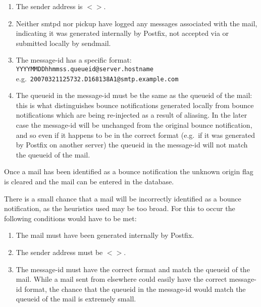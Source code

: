 \documentclass[a4paper,12pt,draft]{article}
\begin{document}
\begin{enumerate}

    \item The sender address is $<>$.

    \item Neither smtpd nor pickup have logged any messages associated with
        the mail, indicating it was generated internally by Postfix, not
        accepted via \SMTP{} or submitted locally by sendmail.

    \item The message-id has a specific format: \newline
        \texttt{YYYYMMDDhhmmss.queueid@server.hostname} \newline
        e.g.\ \texttt{20070321125732.D168138A1@smtp.example.com}

    \item The queueid in the message-id must be the same as the queueid of
        the mail: this is what distinguishes bounce notifications generated
        locally from bounce notifications which are being re-injected as a
        result of aliasing.  In the later case the message-id will be
        unchanged from the original bounce notification, and so even if it
        happens to be in the correct format (e.g.\ if it was generated by
        Postfix on another server) the queueid in the message-id will not
        match the queueid of the mail.

\end{enumerate}

Once a mail has been identified as a bounce notification the unknown origin
flag is cleared and the mail can be entered in the database.

There is a small chance that a mail will be incorrectly identified as a
bounce notification, as the heuristics used may be too broad.  For this to
occur the following conditions would have to be met:

\begin{enumerate}

    \item The mail must have been generated internally by Postfix.

    \item The sender address must be $<>$.

    \item The message-id must have the correct format and match the queueid
        of the mail.  While a mail sent from elsewhere could easily have
        the correct message-id format, the chance that the queueid in the
        message-id would match the queueid of the mail is extremely small.

\end{enumerate}
\end{document}
